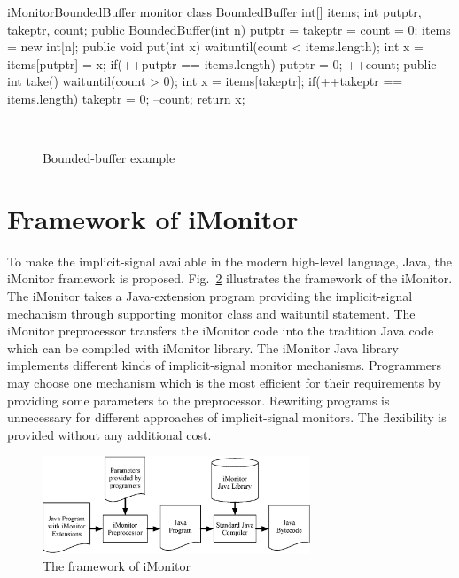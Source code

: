 \documentclass[10pt, conference, compsocconf]{IEEEtran}
\begin{document}
\begin{SaveVerbatim}{iMonitorBoundedBuffer}
monitor class BoundedBuffer { 
  int[] items; 
  int putptr, takeptr, count; 
  public BoundedBuffer(int n) { 
    putptr = takeptr = count = 0; 
    items = new int[n]; 
  } 
  public void put(int x) { 
    waituntil(count < items.length); 
    int x = items[putptr] = x; 
    if(++putptr == items.length) { 
      putptr = 0; 
    } 
    ++count; 
  } 
  public int take() { 
    waituntil(count > 0); 
    int x = items[takeptr]; 
    if(++takeptr == items.length) { 
      takeptr = 0; 
    }
    --count;
    return x;
  }
}
\end{SaveVerbatim}

\begin{figure}
  \centering
  \\
  \caption{Bounded-buffer example}
  \label{fig:bb_exp}
\end{figure}


\section{Framework of iMonitor} \label{sec:fw}
To make the implicit-signal available in the modern high-level language, Java, 
the iMonitor framework is proposed. Fig.~\ref{fig:framework} illustrates the 
framework of the iMonitor. The iMonitor takes a Java-extension program providing
the implicit-signal mechanism through supporting monitor class and waituntil 
statement. The iMonitor preprocessor transfers the iMonitor code into the 
tradition Java code which can be compiled with iMonitor library. The iMonitor 
Java library implements different kinds of implicit-signal monitor mechanisms. 
Programmers may choose one mechanism which is the most efficient for their 
requirements by providing some parameters to the preprocessor. Rewriting 
programs is unnecessary for different approaches of implicit-signal monitors. 
The flexibility is provided without any additional cost. 

\begin{figure}[ht!]
  \centering
  \includegraphics[width=80mm]{fig/flow.eps}
  \caption{The framework of iMonitor}
  \label{fig:framework}
\end{figure}
\end{document}
